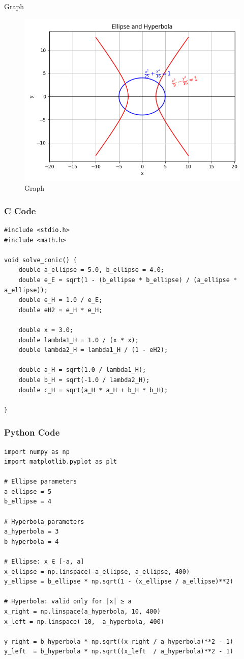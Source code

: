 \documentclass{beamer}
\begin{document}
\begin{frame}{Graph}
\begin{figure}
\centering
\includegraphics[height=0.4\textheight, keepaspectratio]{figs/ell.png}
\caption{Graph}
\end{figure}
\end{frame}

\begin{frame}[fragile]
    \frametitle{C Code}
\begin{lstlisting}
#include <stdio.h>
#include <math.h>

void solve_conic() {
    double a_ellipse = 5.0, b_ellipse = 4.0;
    double e_E = sqrt(1 - (b_ellipse * b_ellipse) / (a_ellipse * a_ellipse));
    double e_H = 1.0 / e_E;
    double eH2 = e_H * e_H;

    double x = 3.0;
    double lambda1_H = 1.0 / (x * x);
    double lambda2_H = lambda1_H / (1 - eH2);

    double a_H = sqrt(1.0 / lambda1_H);
    double b_H = sqrt(-1.0 / lambda2_H);
    double c_H = sqrt(a_H * a_H + b_H * b_H);

}
\end{lstlisting}
\end{frame}

\begin{frame}[fragile]
    \frametitle{Python Code}
\begin{lstlisting}
import numpy as np
import matplotlib.pyplot as plt

# Ellipse parameters
a_ellipse = 5
b_ellipse = 4

# Hyperbola parameters
a_hyperbola = 3
b_hyperbola = 4

# Ellipse: x ∈ [-a, a]
x_ellipse = np.linspace(-a_ellipse, a_ellipse, 400)
y_ellipse = b_ellipse * np.sqrt(1 - (x_ellipse / a_ellipse)**2)

# Hyperbola: valid only for |x| ≥ a
x_right = np.linspace(a_hyperbola, 10, 400)
x_left = np.linspace(-10, -a_hyperbola, 400)

y_right = b_hyperbola * np.sqrt((x_right / a_hyperbola)**2 - 1)
y_left  = b_hyperbola * np.sqrt((x_left  / a_hyperbola)**2 - 1)
\end{lstlisting}
\end{frame}
\end{document}
